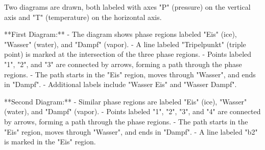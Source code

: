 Two diagrams are drawn, both labeled with axes "P" (pressure) on the vertical axis and "T" (temperature) on the horizontal axis.  

**First Diagram:**  
- The diagram shows phase regions labeled "Eis" (ice), "Wasser" (water), and "Dampf" (vapor).  
- A line labeled "Tripelpunkt" (triple point) is marked at the intersection of the three phase regions.  
- Points labeled "1", "2", and "3" are connected by arrows, forming a path through the phase regions.  
- The path starts in the "Eis" region, moves through "Wasser", and ends in "Dampf".  
- Additional labels include "Wasser Eis" and "Wasser Dampf".  

**Second Diagram:**  
- Similar phase regions are labeled "Eis" (ice), "Wasser" (water), and "Dampf" (vapor).  
- Points labeled "1", "2", "3", and "4" are connected by arrows, forming a path through the phase regions.  
- The path starts in the "Eis" region, moves through "Wasser", and ends in "Dampf".  
- A line labeled "b2" is marked in the "Eis" region.